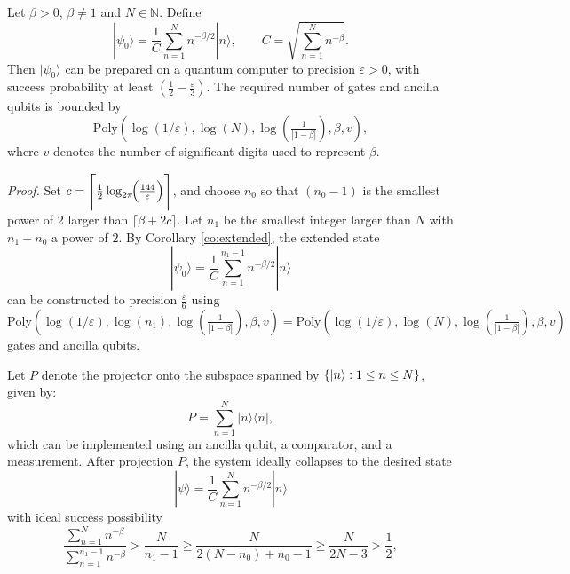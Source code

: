 \documentclass[aps,pra,twocolumn,superscriptaddress,preprintnumbers,amsmath,amssymb]{revtex4-2}
\begin{document}
\begin{theorem}\label{th:initsi}
Let $\beta>0$, $\beta \neq 1$ and $N\in\mathbb{N}$. Define
    \begin{equation}
        |\psi_0\rangle=\frac{1}{C}\sum_{n=1}^{N}n^{-\beta/2}|n\rangle, \qquad C=\sqrt{\sum_{n=1}^{N}n^{-\beta}}.
    \end{equation}
    Then  $|\psi_0\rangle$ can be prepared on a quantum computer to precision $\varepsilon>0$, with success probability at least $(\frac{1}{2}-\frac{\varepsilon}{3})$. The required number of gates and ancilla qubits is bounded by
    \begin{equation}
        \mathrm{Poly}(\log(1/\varepsilon),\log(N),\log(\tfrac{1}{|1-\beta|}),\beta,v),
    \end{equation}
where $v$ denotes the number of significant digits used to represent $\beta$.
\end{theorem}
\noindent\textit{Proof.} 
Set
$c = \Biggl\lceil \frac{1}{2}\log_{2\pi}\!\Bigl(\frac{144}{\varepsilon}\Bigr)\Biggr\rceil$, and choose $n_0$ so that $(n_0-1)$ is the smallest power of 2 larger than $\lceil \beta+2c\rceil$.  
Let $n_1$  be the smallest integer larger than $N$ with $n_1-n_0$ a power of $2$.  By Corollary \ref{co:extended}, the extended state
\begin{equation}
    |\psi_0\rangle=\frac{1}{C}\sum_{n=1}^{n_1-1}n^{-\beta/2}|n\rangle
\end{equation}
can be constructed to precision $\tfrac{\varepsilon}{6}$ using 
\begin{equation}
    \mathrm{Poly}(\log(1/\varepsilon),\log(n_1),\log(\tfrac{1}{|1-\beta|}),\beta,v)=\mathrm{Poly}(\log(1/\varepsilon),\log(N),\log(\tfrac{1}{|1-\beta|}),\beta,v)
\end{equation}
gates and ancilla qubits. \par
Let $P$ denote the projector onto the subspace spanned by $\{\ket{n}:1\le n\le N\}$, given by:
\begin{equation}
    P=\sum_{n=1}^{N}|n\rangle\langle n|,
\end{equation}
which can be implemented using an ancilla qubit, a comparator, and a measurement.
After projection $P$, the system ideally collapses to the desired state
\begin{equation}
|\psi\rangle=\frac{1}{C}\sum_{n=1}^{N}n^{-\beta/2}|n\rangle
\end{equation}
with ideal success possibility
\begin{equation}
    \frac{\textstyle\sum\limits_{n=1}^{N}n^{-\beta}}{\textstyle\sum\limits_{n=1}^{n_1-1}n^{-\beta}}>\frac{N}{n_1-1}\geq\frac{N}{2(N-n_0)+n_0-1}\geq \frac{N}{2N-3}>\frac{1}{2},
\end{equation}
\end{document}
